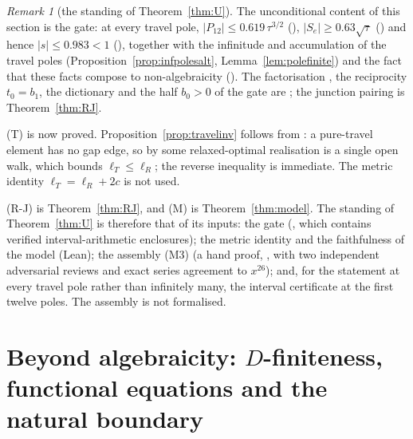 \documentclass[11pt]{article}
\theoremstyle{plain}
\theoremstyle{definition}
\theoremstyle{remark}
\newtheorem{remark}[theorem]{Remark}
\theoremstyle{plain}\newtheorem*{maintheorem}{Main Theorem}
\begin{document}
\begin{remark}[the standing of Theorem~\ref{thm:U}]\label{rem:Ustatus}
The unconditional content of this section is the gate: at every travel pole,
$|P_{12}|\le0.619\,\tau^{3/2}$ ({\cite[Theorem ``the amplitude estimate $(\star)$'', \textup{thm:star}]{Bonfioli2026bB}}), $|S_e|\ge0.63\sqrt\tau$
({\cite[Lemma ``the denominator at the pole'', \textup{app:Se}]{Bonfioli2026bB}}) and hence $|s|\le0.983<1$ ({\cite[Corollary ``the gate closes'', \textup{app:gate}]{Bonfioli2026bB}}), together with the
infinitude and accumulation of the travel poles (Proposition~\ref{prop:infpolesalt},
Lemma~\ref{lem:polefinite}) and the fact that these
facts compose to non-algebraicity ({\cite[Remark ``the assembly is machine-checked'', \textup{rem:uassembly}]{Bonfioli2026bB}}).
The factorisation {\cite[\textup{(eq:mobius)}]{Bonfioli2026bB}}, the reciprocity $t_0=b_1$, the dictionary {\cite[\textup{(eq:dict)}]{Bonfioli2026bB}} and
the half $b_0>0$ of the gate are {\cite[Theorem ``the bulk dictionary at the travel poles'', \textup{thm:L}]{Bonfioli2026bB}}; the junction pairing is Theorem~\ref{thm:RJ}.

\textup{(T)} is now proved. Proposition~\ref{prop:travelinv} follows from
{\cite[Corollary \textup{cor:localzero}]{Bonfioli2026bB}}: a pure-travel element has no gap edge, so by
{\cite[Theorem ``no gap edge forces $c=0$'', \textup{thm:nogap}]{Bonfioli2026bB}} some relaxed-optimal realisation is a single open walk, which bounds
$\ell_T\le\ell_R$; the reverse inequality is immediate. The metric identity
$\ell_T=\ell_R+2c$ is not used.

\textup{(R-J)} is Theorem~\ref{thm:RJ}, and \textup{(M)} is Theorem~\ref{thm:model}. The standing of
Theorem~\ref{thm:U} is therefore that of its inputs: the gate ({\cite[Appendix \textup{app:star}]{Bonfioli2026bB}}, which
contains verified interval-arithmetic enclosures); the metric identity and the faithfulness of the
model (Lean); the assembly \textup{(M3)} (a hand proof, {\cite[Appendix \textup{app:M3prime}]{Bonfioli2026bB}}, with two
independent adversarial reviews and exact series agreement to $x^{26}$); and, for the statement at
every travel pole rather than infinitely many, the interval certificate at the first twelve poles.
The assembly is not formalised.
\end{remark}

\section{Beyond algebraicity: \texorpdfstring{$D$}{D}-finiteness, functional equations and the
natural boundary}\label{sec:beyond}
\end{document}
